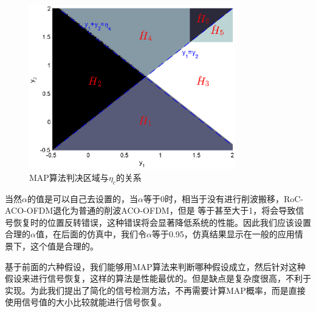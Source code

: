 \begin{figure}[htbp]
    \centering
    \includegraphics[width=0.8\textwidth]{figures/chapter-2/MAP_RoC_ACO_OFDM.eps}
    \caption{MAP算法判决区域与$\eta_c$的关系}
    \label{fig:MAP_RoC_ACO_OFDM}
\end{figure}
当然$\alpha$的值是可以自己去设置的，当$\alpha$等于0时，相当于没有进行削波搬移，RoC-ACO-OFDM退化为普通的削波ACO-OFDM，但是 等于甚至大于1，将会导致信号恢复时的位置反转错误，这种错误将会显著降低系统的性能。因此我们应该设置合理的$\alpha$值，在后面的仿真中，我们令$\alpha$等于0.95，仿真结果显示在一般的应用情景下，这个值是合理的。

基于前面的六种假设，我们能够用MAP算法来判断哪种假设成立，然后针对这种假设来进行信号恢复，这样的算法是性能最优的。但是缺点是复杂度很高，不利于实现。为此我们提出了简化的信号检测方法，不再需要计算MAP概率，而是直接使用信号值的大小比较就能进行信号恢复。

